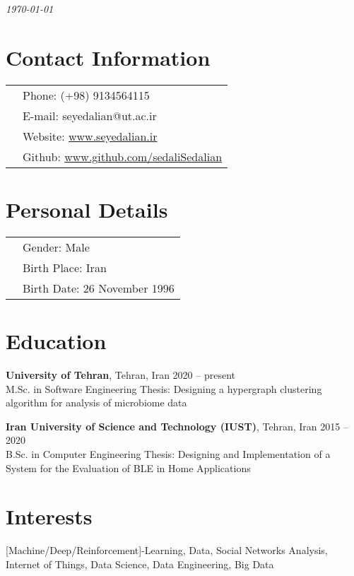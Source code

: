 \documentclass[margin,line]{res}
\begin{document}
 \hfill {\em \today}

\begin{resume}
\section{\sc Contact Information}
\vspace{.05in}
\begin{tabular}{@{}p{3.5in}p{3in}}
& {Phone:}  (+98) 9134564115 \\
& {E-mail:}  seyedalian@ut.ac.ir\\
& {Website:} \url{www.seyedalian.ir}\\
& {Github:}  \url{www.github.com/sedaliSedalian}

\end{tabular}
\section{\sc Personal Details}
\begin{tabular}{@{}p{3.5in}p{3in}}
	& {Gender:}  Male \\
	& {Birth Place:}  Iran \\
	& {Birth Date:}  26 November 1996 \\
\end{tabular}

\section{\sc Education}
{\bf University of Tehran}, Tehran, Iran \hfill 2020 -- present\\
M.Sc. in Software Engineering 
Thesis: Designing a hypergraph clustering algorithm for analysis of microbiome data


{\bf Iran University of  Science and Technology (IUST)}, Tehran, Iran \hfill 2015 -- 2020\\
B.Sc. in Computer Engineering 
Thesis: Designing and Implementation of a System for the Evaluation of BLE in Home Applications


\section{\sc Interests}
[Machine/Deep/Reinforcement]-Learning, Data, Social Networks Analysis,  Internet of Things, Data Science,  Data Engineering, Big Data

\end{resume}
\end{document}
